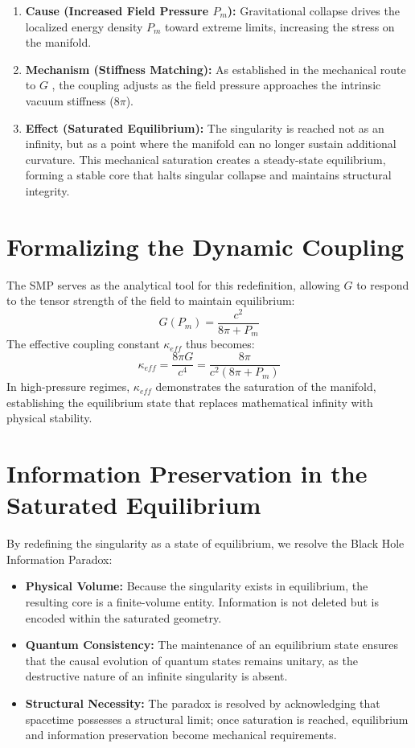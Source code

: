 \documentclass[11pt,letterpaper]{article}
\begin{document}
\begin{enumerate}
    \item \textbf{Cause (Increased Field Pressure $P_m$):} Gravitational collapse drives the localized energy density $P_m$ toward extreme limits, increasing the stress on the manifold.
    \item \textbf{Mechanism (Stiffness Matching):} As established in the mechanical route to $G$ \cite{Skavberg2026}, the coupling adjusts as the field pressure approaches the intrinsic vacuum stiffness ($8\pi$).
    \item \textbf{Effect (Saturated Equilibrium):} The singularity is reached not as an infinity, but as a point where the manifold can no longer sustain additional curvature. This mechanical saturation creates a steady-state equilibrium, forming a stable core that halts singular collapse and maintains structural integrity.
\end{enumerate}



\section{Formalizing the Dynamic Coupling}
The SMP serves as the analytical tool for this redefinition, allowing $G$ to respond to the tensor strength of the field to maintain equilibrium:
\begin{equation}
G(P_m) = \frac{c^2}{8\pi + P_m}
\end{equation}
The effective coupling constant $\kappa_{eff}$ thus becomes:
\begin{equation}
\kappa_{eff} = \frac{8\pi G}{c^4} = \frac{8\pi}{c^2(8\pi + P_m)}
\end{equation}
In high-pressure regimes, $\kappa_{eff}$ demonstrates the saturation of the manifold, establishing the equilibrium state that replaces mathematical infinity with physical stability.

\section{Information Preservation in the Saturated Equilibrium}
By redefining the singularity as a state of equilibrium, we resolve the Black Hole Information Paradox:
\begin{itemize}
    \item \textbf{Physical Volume:} Because the singularity exists in equilibrium, the resulting core is a finite-volume entity. Information is not deleted but is encoded within the saturated geometry.
    \item \textbf{Quantum Consistency:} The maintenance of an equilibrium state ensures that the causal evolution of quantum states remains unitary, as the destructive nature of an infinite singularity is absent.
    \item \textbf{Structural Necessity:} The paradox is resolved by acknowledging that spacetime possesses a structural limit; once saturation is reached, equilibrium and information preservation become mechanical requirements.
\end{itemize}
\end{document}
